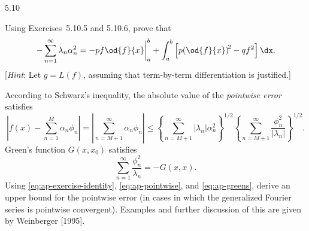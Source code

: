 \begin{exercises}{5.10}
\item Using Exercises~5.10.5 and 5.10.6, prove that
\begin{equation}
\label{eq:ap-exercise-identity}
-\sum_{n=1}^{\infty} \lambda_n\alpha_n^2 = -pf\od{f}{x}\bigg|_a^b + \int_a^b \left[p\!\left(\od{f}{x}\right)^{\!2} - qf^2\right]\dx.
\end{equation}
[\textit{Hint}: Let $g = L(f)$, assuming that term-by-term differentiation is justified.]

\item According to Schwarz's inequality, the absolute value of the \textit{pointwise error} satisfies
\begin{equation}
\label{eq:ap-pointwise}
\left|f(x) - \sum_{n=1}^M \alpha_n\phi_n\right| = \left|\sum_{n=M+1}^{\infty} \alpha_n\phi_n\right| \le \left\{\sum_{n=M+1}^{\infty} |\lambda_n|\alpha_n^2\right\}^{1/2} \left\{\sum_{n=M+1}^{\infty} \frac{\phi_n^2}{|\lambda_n|}\right\}^{1/2}.
\end{equation}
Green's function $G(x,x_0)$ satisfies
\begin{equation}
\label{eq:ap-greens}
\sum_{n=1}^{\infty} \frac{\phi_n^2}{\lambda_n} = -G(x,x).
\end{equation}
Using \eqref{eq:ap-exercise-identity}, \eqref{eq:ap-pointwise}, and \eqref{eq:ap-greens}, derive an upper bound for the pointwise error (in cases in which the generalized Fourier series is pointwise convergent).  Examples and further discussion of this are given by Weinberger [1995].

\end{exercises}
